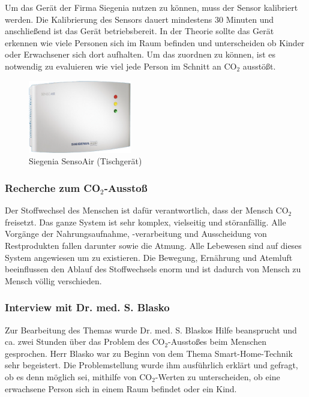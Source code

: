Um das Gerät der Firma Siegenia nutzen zu können, muss der Sensor kalibriert werden. Die Kalibrierung des Sensors dauert mindestens 30 Minuten und anschließend ist das Gerät betriebsbereit. In der Theorie sollte das Gerät erkennen wie viele Personen sich im Raum befinden und unterscheiden ob Kinder oder Erwachsener sich dort aufhalten. Um das zuordnen zu können, ist es notwendig zu evaluieren wie viel jede Person im Schnitt an CO$_2$ ausstößt.

\begin{figure}[h!]
	\centering
	\includegraphics[width=0.4\textwidth]{img/PersonIdentification/sensoAir.png}
	\caption{Siegenia SensoAir (Tischgerät)}
	\label{fig:sensoAir}
\end{figure}

\subsubsection{Recherche zum CO$_2$-Ausstoß}
Der Stoffwechsel des Menschen ist dafür verantwortlich, dass der Mensch CO$_2$ freisetzt. Das ganze System ist sehr komplex, vielseitig und störanfällig. Alle Vorgänge der Nahrungsaufnahme, -verarbeitung und Ausscheidung von Restprodukten fallen darunter sowie die Atmung. Alle Lebewesen sind auf dieses System angewiesen um zu existieren. Die Bewegung, Ernährung und Atemluft beeinflussen den Ablauf des Stoffwechsels enorm und ist dadurch von Mensch zu Mensch völlig verschieden.

\subsubsection{Interview mit Dr. med. S. Blasko}
Zur Bearbeitung des Themas wurde Dr. med. S. Blaskos Hilfe beansprucht und ca. zwei Stunden über das Problem des CO$_2$-Ausstoßes beim Menschen gesprochen. Herr Blasko war zu Beginn von dem Thema Smart-Home-Technik sehr begeistert. Die Problemstellung wurde ihm ausführlich erklärt und gefragt, ob es denn möglich sei, mithilfe von CO$_2$-Werten zu unterscheiden, ob eine erwachsene Person sich in einem Raum befindet oder ein Kind.

